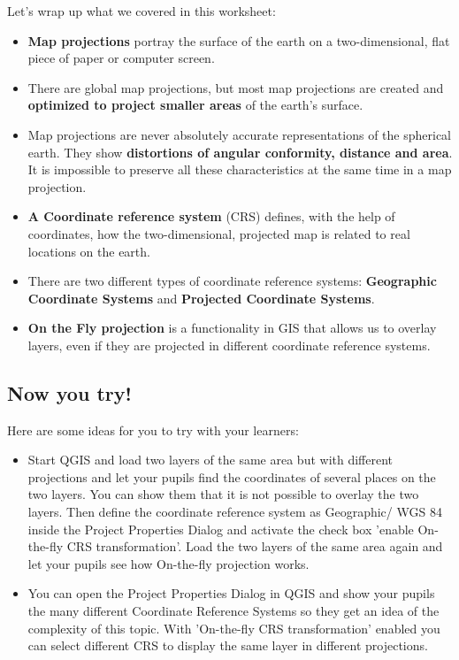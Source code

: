 Let's wrap up what we covered in this worksheet:

\begin{itemize}
\item \textbf{Map projections} portray the surface of the earth on a two-dimensional, flat
piece of paper or computer screen. 
\item There are global map projections, but most map projections are created and
\textbf{optimized to project smaller areas} of the earth's surface.
\item Map projections are never absolutely accurate representations of the
spherical earth. They show \textbf{distortions of angular conformity, distance and
area}. It is impossible to preserve all these characteristics at the same time
in a map projection.
\item \textbf{A Coordinate reference system} (CRS) defines, with the help of
coordinates,
how the two-dimensional, projected map is related to real locations on the
earth.
\item There are two different types of coordinate reference systems:
\textbf{Geographic Coordinate Systems} and \textbf{Projected Coordinate
Systems}.
\item \textbf{On the Fly projection} is a functionality in GIS that allows us
to overlay
layers, even if they are projected in different coordinate reference systems.
\end{itemize}

\subsection{Now you try!}

Here are some ideas for you to try with your learners:

\begin{itemize}
\item Start QGIS and load two layers of the same area but with different
projections and let your pupils find the coordinates of several places on the
two layers. You can show them that it is not possible to overlay the two
layers. Then define the coordinate reference system as Geographic/ WGS 84
inside the Project Properties Dialog and activate the check box 'enable
On-the-fly CRS transformation'. Load the two layers of the same area again
and let your pupils see how On-the-fly projection works.
\item You can open the Project Properties Dialog in QGIS and show your pupils the
many different Coordinate Reference Systems so they get an idea of the
complexity of this topic. With 'On-the-fly CRS transformation' enabled you
can select different CRS to display the same layer in different projections.
\end{itemize}

